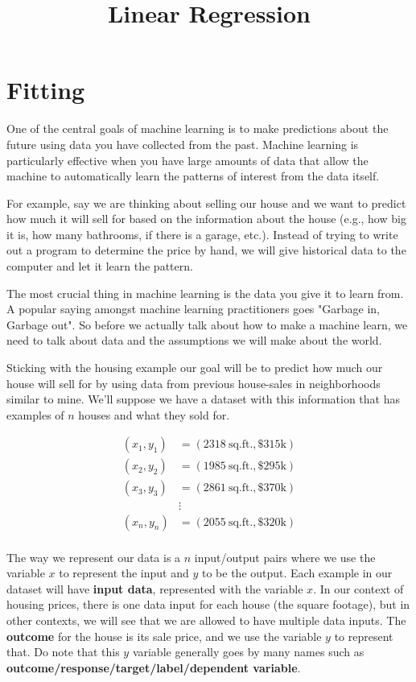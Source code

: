 \documentclass{article}
\title{Linear Regression}
\date{}
\begin{document}
\section{Fitting}
One of the central goals of machine learning is to make predictions about the future using data you have collected from the past. Machine learning is particularly effective when you have large amounts of data that allow the machine to automatically learn the patterns of interest from the data itself.

For example, say we are thinking about selling our house and we want to predict how much it will sell for based on the information about the house (e.g., how big it is, how many bathrooms, if there is a garage, etc.). Instead of trying to write out a program to determine the price by hand, we will give historical data to the computer and let it learn the pattern.

The most crucial thing in machine learning is the data you give it to learn from. A popular saying amongst machine learning practitioners goes "Garbage in, Garbage out". So before we actually talk about how to make a machine learn, we need to talk about data and the assumptions we will make about the world.

Sticking with the housing example our goal will be to predict how much our house will sell for by using data from previous house-sales in neighborhoods similar to mine. We'll suppose we have a dataset with this information that has examples of $n$ houses and what they sold for.

\begin{align*}
    (x_1, y_1) &= (2318\ \text{sq.ft.}, \$315\text{k})\\
    (x_2, y_2) &= (1985\ \text{sq.ft.}, \$295\text{k})\\
    (x_3, y_3) &= (2861\ \text{sq.ft.}, \$370\text{k})\\
    \ &\vdots \\
    (x_n, y_n) &= (2055\ \text{sq.ft.}, \$320\text{k})\\
\end{align*}

 The way we represent our data is a $n$ input/output pairs where we use the variable $x$ to represent the input and $y$ to be the output. Each example in our dataset will have \textbf{input data}, represented with the variable $x$. In our context of housing prices, there is one data input for each house (the square footage), but in other contexts, we will see that we are allowed to have multiple data inputs. The \textbf{outcome} for the house is its sale price, and we use the variable $y$ to represent that. Do note that this $y$ variable generally goes by many names such as \textbf{outcome/response/target/label/dependent variable}.
 
\end{document}
